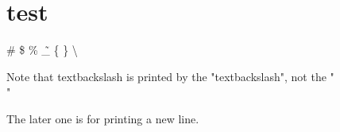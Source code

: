\documentclass[12pt]{article}
\begin{document}
\section{test}
	\# \$ \% \~ \_ \{ \} \textbackslash
	
	Note that textbackslash is printed by the "textbackslash", not the "\\"
	
	The later one is for printing a new line.	
	
	
\end{document}
